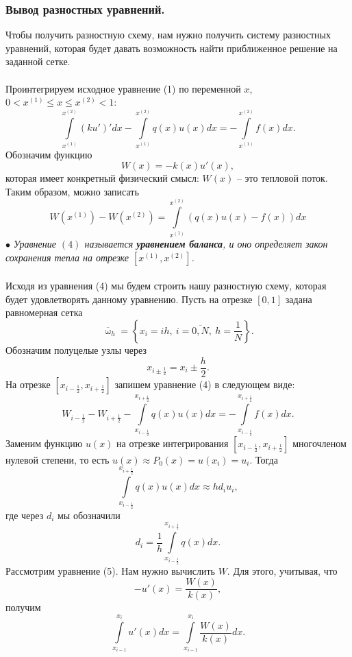 \documentclass[a4paper, 12pt]{report}
\numberwithin{equation}{section}
\newcommand{\ol}{\overline}
\renewcommand{\leq}{\leqslant}
\renewcommand{\omega}{\upomega}
\begin{document}
		\subsubsection{Вывод разностных уравнений.}
		Чтобы получить разностную схему, нам нужно получить систему разностных уравнений, которая будет давать возможность найти приближенное решение на заданной сетке. \\\\
		Проинтегрируем исходное уравнение (1) по переменной $x$, $0<x^{(1)}\leq x \leq x^{(2)}<1$:
		$$\int\limits_{x^{(1)}}^{x^{(2)}} (ku')'dx - \int\limits_{x^{(1)}}^{x^{(2)}} q(x)u(x)dx = - \int\limits_{x^{(1)}}^{x^{(2)}} f(x)dx.$$
		Обозначим функцию
		$$W(x) = -k(x) u'(x),$$ которая имеет конкретный физический смысл: $W(x)$ -- это тепловой поток. Таким образом, можно записать
		\begin{equation}
			W(x^{(1)}) - W(x^{(2)})=\int\limits_{x^{(1)}}^{x^{(2)}} (q(x)u(x) - f(x))dx
		\end{equation} 
		$\bullet$ \textit{Уравнение $(4)$ называется \textbf{уравнением баланса}, и оно определяет закон сохранения тепла на отрезке $[x^{(1)}, x^{(2)}]$.}\\\\
		Исходя из уравнения (4) мы будем строить нашу разностную схему, которая будет удовлетворять данному уравнению.
		Пусть на отрезке $[0,1]$ задана равномерная сетка
		$$\ol \omega_h = \left\{x_i = ih,\ i = \overline{0,N}, \ h = \dfrac 1N\right\}.$$
		Обозначим  полуцелые узлы через $$x_{i\pm\frac 12} = x_i \pm \dfrac h2.$$
		На отрезке $[x_{i - \frac 12}, x_{i+\frac 12}]$ запишем уравнение (4) в следующем виде:
		\begin{equation}
			W_{i-\frac 12} - W_{i +\frac 12} - \int\limits_{x_{i-\frac12}}^{x_{i+\frac12}} q(x)u(x)dx  =  - \int\limits_{x_{i-\frac12}}^{x_{i+\frac12}}f(x)dx.
		\end{equation}
		Заменим функцию $u(x)$ на отрезке интегрирования $[x_{i - \frac 12}, x_{i+\frac 12}]$ многочленом нулевой степени, то есть $u(x) \approx P_0(x) = u(x_i) = u_i$. Тогда
		$$\int\limits_{x_{i-\frac12}}^{x_{i+\frac12}} q(x)u(x)dx \approx hd_i u_i,$$
		где через $d_i$ мы обозначили 
		\begin{equation}
			d_i =\dfrac 1h \int\limits_{x_{i-\frac12}}^{x_{i+\frac12}} q(x) dx.
		\end{equation}
		Рассмотрим уравнение (5). Нам нужно вычислить $W$. Для этого, учитывая, что 
		$$-u'(x) = \dfrac{W(x)}{k(x)},$$
		получим
		$$\int\limits_{x_{i-1}}^{x_i} u'(x)dx = \int\limits_{x_{i-1}}^{x_i} \dfrac{W (x)}{k(x)}dx.$$
\end{document}
